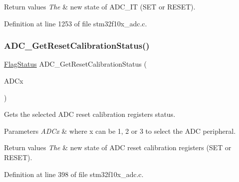 \begin{DoxyRetVals}{Return values}
{\em The} & new state of A\+D\+C\+\_\+\+IT (S\+ET or R\+E\+S\+ET). \\
\hline
\end{DoxyRetVals}


Definition at line 1253 of file stm32f10x\+\_\+adc.\+c.

\mbox{\label{group___a_d_c___exported___functions_ga113be9fe25add8d7496bed659c68e02b}} 
\subsubsection{\texorpdfstring{A\+D\+C\+\_\+\+Get\+Reset\+Calibration\+Status()}{ADC\_GetResetCalibrationStatus()}}
{\footnotesize\ttfamily \hyperlink{group___exported__types_ga89136caac2e14c55151f527ac02daaff}{Flag\+Status} A\+D\+C\+\_\+\+Get\+Reset\+Calibration\+Status (\begin{DoxyParamCaption}\item[{\hyperlink{struct_a_d_c___type_def}{A\+D\+C\+\_\+\+Type\+Def} $\ast$}]{A\+D\+Cx }\end{DoxyParamCaption})}



Gets the selected A\+DC reset calibration registers status. 


\begin{DoxyParams}{Parameters}
{\em A\+D\+Cx} & where x can be 1, 2 or 3 to select the A\+DC peripheral. \\
\hline
\end{DoxyParams}

\begin{DoxyRetVals}{Return values}
{\em The} & new state of A\+DC reset calibration registers (S\+ET or R\+E\+S\+ET). \\
\hline
\end{DoxyRetVals}


Definition at line 398 of file stm32f10x\+\_\+adc.\+c.

\mbox{\label{group___a_d_c___exported___functions_gaf1119583782ecbcec380efcb7eb74883}} 
